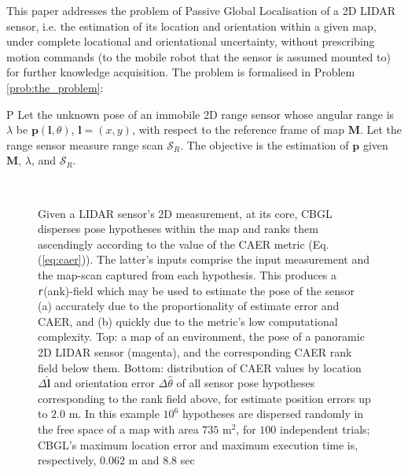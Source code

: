 This paper addresses the problem of Passive Global Localisation of a 2D LIDAR
sensor, i.e. the estimation of its location and orientation within a given map,
under complete locational and orientational uncertainty, without prescribing
motion commands (to the mobile robot that the sensor is assumed mounted to) for
further knowledge acquisition. The problem is formalised in Problem
\ref{prob:the_problem}:

\begin{customprb}{P}
  \label{prob:the_problem}
  Let the unknown pose of an immobile 2D range sensor whose angular range is
  $\lambda$ be $\bm{p}(\bm{l},\theta)$, $\bm{l} = (x,y)$, with respect to the
  reference frame of map $\bm{M}$. Let the range sensor measure range scan
  $\mathcal{S}_R$. The objective is the estimation of $\bm{p}$ given $\bm{M}$,
  $\lambda$, and $\mathcal{S}_R$.
\end{customprb}

\begin{figure}\vspace{0.4em}
  \subfloat{    \label{fig:a}} \vspace{-1.7cm}\\
  \subfloat{\hspace{-0.3cm} \label{fig:b}}
  \caption{\small
           Given a LIDAR sensor's 2D measurement, at its core, CBGL disperses
           pose hypotheses within the map and ranks them ascendingly according
           to the value of the CAER metric (Eq. (\ref{eq:caer})). The latter's
           inputs comprise the input measurement and the map-scan captured from
           each hypothesis. This produces a \texttt{r}(ank)-field which may be
           used to estimate the pose of the sensor (a) accurately due to the
           proportionality of estimate error and CAER, and (b) quickly due to
           the metric's low computational complexity.  Top: a map of an
           environment, the pose of a panoramic 2D LIDAR sensor (magenta), and
           the corresponding CAER rank field below them. Bottom: distribution
           of CAER values by location $\Delta \hat{\bm{l}}$ and orientation
           error $\Delta \hat{\theta}$ of all sensor pose hypotheses
           corresponding to the rank field above, for estimate position errors
           up to $2.0$ m. In this example $10^6$ hypotheses are dispersed
           randomly in the free space of a map with area $735$ m$^2$, for $100$
           independent trials; CBGL's maximum location error and maximum
           execution time is, respectively, $0.062$ m and $8.8$ sec }
  \vspace{-0.75cm}
  \label{fig:face}
\end{figure}

\lipsum[0-3]
